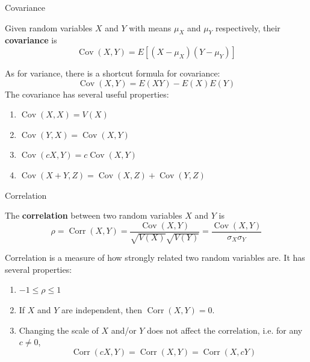 \documentclass[xcolor=table]{beamer}
\renewcommand{\emph}{\textbf}
\DeclareMathOperator{\Cov}{Cov}
\DeclareMathOperator{\Corr}{Corr}
\begin{document}
\begin{frame}{Covariance}
\begin{block}{}
Given random variables $X$ and $Y$ with means $\mu_X$ and $\mu_Y$ respectively, their \emph{covariance} is
$$\Cov(X,Y) = E[(X-\mu_X)(Y-\mu_Y)]$$
\end{block}
\pause As for variance, there is a shortcut formula for covariance:
$$\Cov(X,Y) = E(XY) - E(X)E(Y)$$
\pause The covariance has several useful properties: 
\begin{block}{}
\begin{enumerate}
\item $\Cov(X,X) = V(X)$
\item $\Cov(Y,X) = \Cov(X,Y)$
\item $\Cov(cX,Y) = c\Cov(X,Y)$
\item $\Cov(X+Y,Z) = \Cov(X,Z)+\Cov(Y,Z)$
\end{enumerate}
\end{block}
\end{frame}

\begin{frame}{Correlation}
\begin{block}{}
The \emph{correlation} between two random variables $X$ and $Y$ is 
$$\rho = \Corr(X,Y) = \frac{\Cov(X,Y)}{\sqrt{V(X)}\sqrt{V(Y)}} = \frac{\Cov(X,Y)}{\sigma_X\sigma_Y}$$
\end{block}
Correlation is a measure of how strongly related two random variables are. \pause It has several properties:
\begin{block}{}
\begin{enumerate}
\item $-1 \leq \rho \leq 1$
\item  If $X$ and $Y$ are independent, then $\Corr(X,Y)=0$.
\item Changing the scale of $X$ and/or $Y$ does not affect the correlation, i.e. for any $c\neq 0$,
$$\Corr(cX,Y) = \Corr(X,Y) = \Corr(X,cY)$$
\end{enumerate}
\end{block}
\end{frame}
\end{document}
